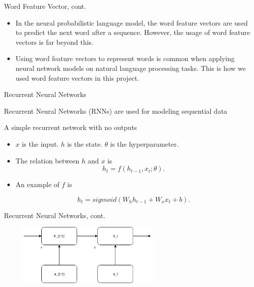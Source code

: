 \documentclass{beamer}
\begin{document}
\begin{frame}{Word Feature Vector, cont.}
   \begin{itemize}
       \item In the neural probabilistic language model, the word feature vectors are used to predict the next word after a sequence. However, the usage of word feature vectors is far beyond this.
       \item Using word feature vectors to represent words is common when applying neural network models on natural language processing tasks. This is how we used word feature vectors in this project.
   \end{itemize}

\end{frame}
\begin{frame}{Recurrent Neural Networks}

Recurrent Neural Networks (RNNs) are used for modeling sequential data

    \begin{examples}{A simple recurrent network with no outputs}
        \begin{itemize}
            \item $x$ is the input. $h$ is the state. $\theta$ is the hyperparameter.
            \item The relation between $h$ and $x$ is
            $$h_t = f(h_{t-1}, x_t; \theta).$$

            \item An example of $f$ is

            $$h_t = sigmoid(W_h h_{t-1} + W_x x_t + b).$$
        \end{itemize}
    \end{examples}

\end{frame}

\begin{frame}{Recurrent Neural Networks, cont.}
    \begin{center}
      \includegraphics[width=9cm, height=3cm]{figures/rnnWithNoOutputs}
    \end{center}
\end{frame}
\end{document}
